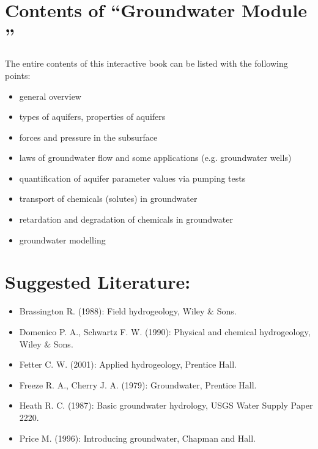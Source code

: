 \documentclass[letterpaper,10pt,english]{jupyterBook}
\begin{document}
\section{Contents of “Groundwater Module ”}
\label{\detokenize{content/background/03_basic_hydrogeology:contents-of-groundwater-module}}
\sphinxAtStartPar
The entire contents of this interactive book can be listed with the following points:
\begin{itemize}
\item {} 
\sphinxAtStartPar
general overview

\item {} 
\sphinxAtStartPar
types of aquifers, properties of aquifers

\item {} 
\sphinxAtStartPar
forces and pressure in the subsurface

\item {} 
\sphinxAtStartPar
laws of groundwater flow and some applications (e.g. groundwater wells)

\item {} 
\sphinxAtStartPar
quantification of aquifer parameter values via pumping tests

\item {} 
\sphinxAtStartPar
transport of chemicals (solutes) in groundwater

\item {} 
\sphinxAtStartPar
retardation and degradation of chemicals in groundwater

\item {} 
\sphinxAtStartPar
groundwater modelling

\end{itemize}


\section{Suggested Literature:}
\label{\detokenize{content/background/03_basic_hydrogeology:suggested-literature}}\begin{itemize}
\item {} 
\sphinxAtStartPar
Brassington R. (1988): Field hydrogeology, Wiley \& Sons.

\item {} 
\sphinxAtStartPar
Domenico P. A., Schwartz F. W. (1990): Physical and chemical hydrogeology, Wiley \& Sons.

\item {} 
\sphinxAtStartPar
Fetter C. W. (2001): Applied hydrogeology, Prentice Hall.

\item {} 
\sphinxAtStartPar
Freeze R. A., Cherry J. A. (1979): Groundwater, Prentice Hall.

\item {} 
\sphinxAtStartPar
Heath R. C. (1987): Basic groundwater hydrology, USGS Water Supply Paper 2220.

\item {} 
\sphinxAtStartPar
Price M. (1996): Introducing groundwater, Chapman and Hall.

\end{itemize}
\end{document}
